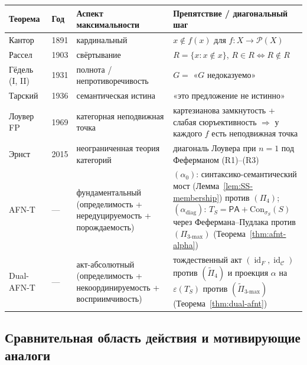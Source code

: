 \documentclass[11pt]{article}
\theoremstyle{plain}
\theoremstyle{definition}
\newcommand{\cC}{\mathcal{C}}
\newcommand{\cP}{\mathcal{P}}
\newcommand{\Con}{\mathrm{Con}}
\newcommand{\PA}{\mathsf{PA}}
\DeclareMathOperator{\id}{id}
\begin{document}
\begin{center}
\begin{tabular}{@{}l l >{\raggedright\arraybackslash}p{3.3cm} >{\raggedright\arraybackslash}p{5.7cm}@{}}
\toprule
Теорема & Год & Аспект максимальности & Препятствие / диагональный шаг \\ \midrule
Кантор~\cite{Cantor1891} & 1891 & кардинальный & $x \notin f(x)$ для $f : X \to \cP(X)$ \\
Рассел~\cite{Russell1903} & 1903 & свёртывание & $R = \{x : x \notin x\}$, $R \in R \iff R \notin R$ \\
Гёдель (I, II)~\cite{Godel1931} & 1931 & полнота / непротиворечивость & $G = $ «$G$ недоказуемо» \\
Тарский~\cite{Tarski1936} & 1936 & семантическая истина & «это предложение не истинно» \\
Лоувер FP~\cite{Lawvere1969} & 1969 & категорная неподвижная точка & картезианова замкнутость + слабая сюръективность $\Rightarrow$ у каждого $f$ есть неподвижная точка \\
Эрнст~\cite{Ernst2015} & 2015 & неограниченная теория категорий & диагональ Лоувера при $n = 1$ под Феферманом (R1)--(R3) \\
AFN-T & --- & фундаментальный (определимость + нередуцируемость + порождаемость) & $(\alpha_0)$: синтаксико-семантический мост (Лемма~\ref{lem:SS-membership}) против $(\Pi_4)$; $(\alpha_{\mathrm{diag}})$: $T_S = \PA + \Con_{\sigma_S}(S)$ через Фефермана--Пудлака против $(\Pi_{3\text{-max}})$ (Теорема~\ref{thm:afnt-alpha}) \\
Dual-AFN-T & --- & акт-абсолютный (определимость + некоординируемость + восприимчивость) & тождественный акт $(\id_F, \id_\cC)$ против $(\tilde{\Pi}_4)$ и проекция $\alpha$ на $\varepsilon(T_S)$ против $(\tilde{\Pi}_{3\text{-max}})$ (Теорема~\ref{thm:dual-afnt}) \\
\bottomrule
\end{tabular}
\end{center}

\subsection{Сравнительная область действия и мотивирующие аналоги}
\end{document}
